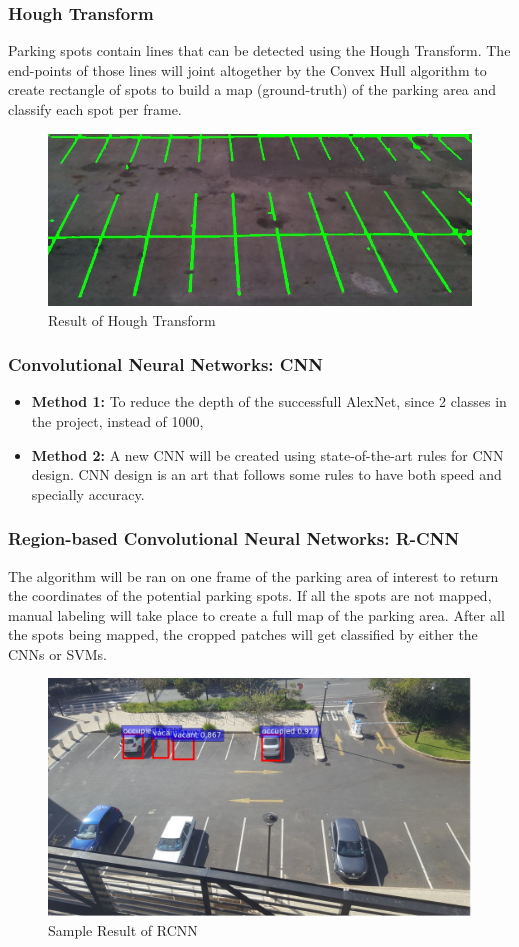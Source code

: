 \documentclass{beamer}
\begin{document}
\begin{frame}
\frametitle{Hough Transform}
Parking spots contain lines that can be detected using the Hough Transform. The end-points of those lines will joint altogether by the Convex Hull algorithm to create rectangle of spots to build a map (ground-truth) of the parking area and classify each spot per frame.
\begin{figure}
	\centering
	\includegraphics[width=0.7\linewidth]{Pictures/output_houghl}
	\caption{Result of Hough Transform}
	\label{fig:outputhoughl}
\end{figure}
\end{frame}

\begin{frame}
\frametitle{Convolutional Neural Networks: CNN}
\begin{itemize}
	\item \textbf{Method 1:} To reduce the depth of the successfull AlexNet, since 2 classes in the project, instead of 1000,
	\item \textbf{Method 2:} A new CNN will be created using state-of-the-art rules for CNN design. CNN design is an art that follows some rules to have both speed and specially accuracy.  
\end{itemize}
\end{frame}

\begin{frame}
\frametitle{Region-based Convolutional Neural Networks: R-CNN}

The algorithm will be ran on one frame of the parking area of interest to return the coordinates of the potential parking spots. If all the spots are not mapped, manual labeling will take place to create a full map of the parking area. 
After all the spots being mapped, the cropped patches will get classified by either the CNNs or SVMs.

\begin{figure}
	\centering
	\includegraphics[width=0.7\linewidth]{Pictures/3}
	\caption{Sample Result of RCNN}
	\label{rcnn_example}
\end{figure}

\end{frame}
\end{document}
